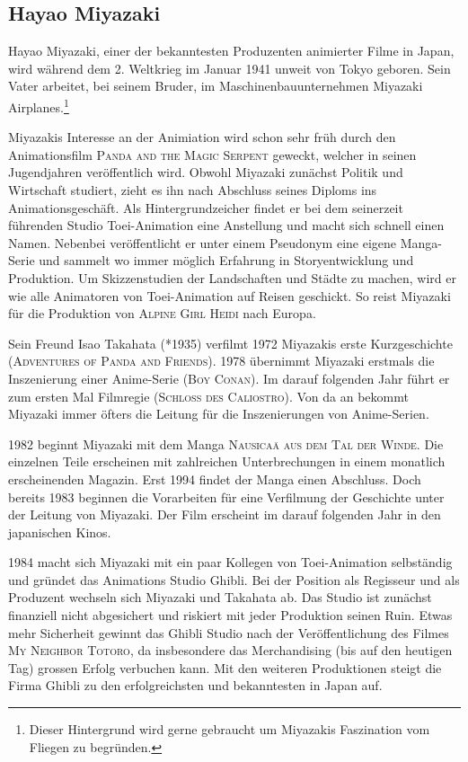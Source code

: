 \subsection{Hayao Miyazaki}
Hayao Miyazaki, einer der bekanntesten Produzenten animierter Filme in Japan, wird während dem 2. Weltkrieg im Januar 1941 unweit von Tokyo geboren. Sein Vater arbeitet, bei seinem Bruder, im Maschinenbauunternehmen Miyazaki Airplanes.\footnote{Dieser Hintergrund wird gerne gebraucht um Miyazakis Faszination vom Fliegen zu begründen.} 

Miyazakis Interesse an der Animiation wird schon sehr früh durch den Animationsfilm \textsc{Panda and the Magic Serpent} geweckt, welcher in seinen Jugendjahren veröffentlich wird. Obwohl Miyazaki zunächst Politik und Wirtschaft studiert, zieht es ihn nach Abschluss seines Diploms ins Animationsgeschäft. Als Hintergrundzeicher findet er bei dem seinerzeit führenden Studio Toei-Animation eine Anstellung und macht sich schnell einen Namen. Nebenbei veröffentlicht er unter einem Pseudonym eine eigene Manga-Serie und sammelt wo immer möglich Erfahrung in Storyentwicklung und Produktion. Um Skizzenstudien der Landschaften und Städte zu machen, wird er wie alle Animatoren von Toei-Animation auf Reisen geschickt. So reist Miyazaki für die Produktion von \textsc{Alpine Girl Heidi} nach Europa.

Sein Freund Isao Takahata (*1935) verfilmt 1972 Miyazakis erste Kurzgeschichte (\textsc{Adventures of Panda and Friends}). 1978 übernimmt Miyazaki erstmals die Inszenierung einer Anime-Serie (\textsc{Boy Conan}). Im darauf folgenden Jahr führt er zum ersten Mal Filmregie (\textsc{Schloss des Caliostro}). Von da an bekommt Miyazaki immer öfters die Leitung für die Inszenierungen von Anime-Serien. 

1982 beginnt Miyazaki mit dem Manga \textsc{Nausicaä aus dem Tal der Winde}. Die einzelnen Teile erscheinen mit zahlreichen Unterbrechungen in einem monatlich erscheinenden Magazin. Erst 1994 findet der Manga einen Abschluss. Doch bereits 1983 beginnen die Vorarbeiten für eine Verfilmung der Geschichte unter der Leitung von Miyazaki. Der Film erscheint im darauf folgenden Jahr in den japanischen Kinos. 

1984 macht sich Miyazaki mit ein paar Kollegen von Toei-Animation selbständig und gründet das Animations Studio Ghibli. Bei der Position als Regisseur und als Produzent wechseln sich Miyazaki und Takahata ab. Das Studio ist zunächst finanziell nicht abgesichert und riskiert mit jeder Produktion seinen Ruin. Etwas mehr Sicherheit gewinnt das Ghibli Studio nach der Veröffentlichung des Filmes \textsc{My Neighbor Totoro}, da insbesondere das Merchandising (bis auf den heutigen Tag) grossen Erfolg verbuchen kann. Mit den weiteren Produktionen steigt die Firma Ghibli zu den erfolgreichsten und bekanntesten in Japan auf. 

